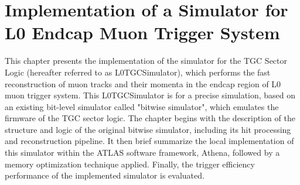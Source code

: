 \chapter{Implementation of a Simulator for L0 Endcap Muon Trigger System} \label{ch:L0MuonS1TGC}
This chapter presents the implementation of the simulator for the TGC Sector Logic (hereafter referred to as L0TGCSimulator), which performs the fast reconstruction of muon tracks and their momenta in the endcap region of L0 muon trigger system. This L0TGCSimulator is for a precise simulation, based on an existing bit-level simulator called "bitwise simulator", which emulates the firmware of the TGC sector logic. The chapter begins with the description of the structure and logic of the original bitwise simulator, including its hit processing and reconstruction pipeline. It then brief summarize the local implementation of this simulator within the ATLAS software framework, Athena, followed by a memory optimization technique applied. Finally, the trigger efficiency performance of the implemented simulator is evaluated.

